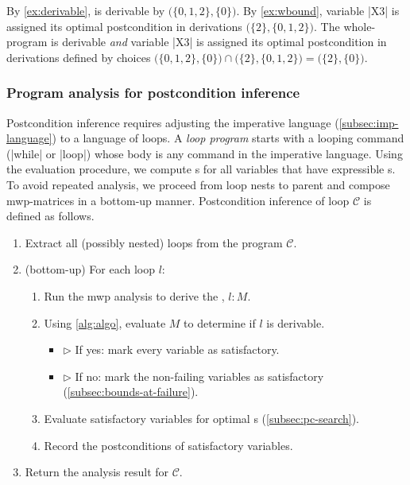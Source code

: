 \begin{example}\label{ex:opt-derivation}
By \autoref{ex:derivable}, \exname is derivable by  \(\big(\{0, 1, 2\}, \{0\}\big)\).
By \autoref{ex:wbound}, variable \pr|X3| is assigned its optimal postcondition in derivations \(\big(\{2\}, \{0,1,2\}\big)\).
The whole-program is derivable \emph{and} variable \pr|X3| is assigned its optimal postcondition in derivations defined by choices
\( \big(\{0, 1, 2\}, \{0\}\big) \cap \big(\{2\}, \{0,1,2\}\big) = \big( \{2\}, \{0\}\big) \).
\end{example}

\subsubsection{Program analysis for postcondition inference}
\label{subsec:inference}

Postcondition inference requires adjusting the imperative
language (\autoref{subsec:imp-language}) to a
language of loops. A \emph{loop program} starts with a looping command
(\pr|while| or \pr|loop|) whose body is any command in the
imperative language. Using the  evaluation procedure, we compute
s for all variables that have expressible s.
To avoid repeated analysis, we proceed from loop nests to
parent and compose mwp-matrices in a bottom-up manner.
Postcondition inference of loop
\(\mathcal{C}\) is defined as follows.

\begin{enumerate}
    \item Extract all (possibly nested) loops from the
    program \(\mathcal{C}\).
    \item (bottom-up) For each loop \(l\):
    \begin{enumerate}[label=(\roman*)]
    \item Run the mwp analysis to derive the , \(l :
    M\).
    \item Using \autoref{alg:algo}, evaluate \(M\) to determine if
    \(l\) is derivable.
    \begin{itemize}
        \item[] \(\triangleright\) If yes: mark every variable as satisfactory.
        \item[] \(\triangleright\) If no: mark the non-failing variables as
        satisfactory (\autoref{subsec:bounds-at-failure}).
    \end{itemize}
    \item Evaluate satisfactory variables for optimal s
    (\autoref{subsec:pc-search}).
    \item Record the postconditions of satisfactory variables.
    \end{enumerate}
    \item Return the analysis result for \(\mathcal{C}\).
\end{enumerate}


